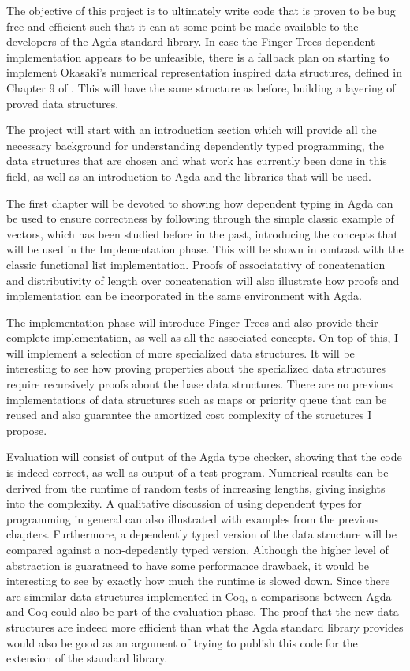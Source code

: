 \documentclass[12pt]{article}
\begin{document}
The objective of this project is to ultimately write code that is proven to be
bug free and efficient such that it can at some point be made available to the
developers of the Agda standard library.
In case the Finger Trees dependent implementation appears to be unfeasible,
there is a fallback plan on starting to implement Okasaki's numerical representation
inspired data structures, defined in Chapter 9 of \cite{okasaki}. This will have the same
structure as before, building a layering of proved data structures.

The project will start with an introduction section which will provide all the
necessary background for understanding dependently typed programming, the
data structures that are chosen and what work has currently been done in this
field, as well as an introduction to Agda and the libraries that will be used.

The first chapter will be devoted to showing how dependent typing in Agda can be
used to ensure correctness by following through the simple classic example of
vectors, which has been studied before in the past, introducing the concepts that
will be used in the Implementation phase. This will be shown in contrast with
the classic functional list implementation. Proofs of associatativy of concatenation
and distributivity of length over concatenation will also illustrate how
proofs and implementation can be incorporated in the same environment with Agda.

The implementation phase will introduce Finger Trees and also provide their complete
implementation, as well as all the associated concepts. On top of this,
I will implement a selection of more specialized data structures. It will
be interesting to see how proving properties about the specialized data structures
require recursively proofs about the base data structures. There are no previous
implementations of data structures such as maps or priority queue that can be reused
and also guarantee the amortized cost complexity of the structures I propose.

Evaluation will consist of output of the Agda type checker, showing that the
code is indeed correct, as well as output of a test program. Numerical results
can be derived from the runtime of random tests of increasing lengths, giving
insights into the complexity.
A qualitative discussion of using dependent types for programming in general
can also illustrated with examples from the previous chapters.
Furthermore, a dependently typed version of the data structure will be compared
against a non-depedently typed version. Although the higher level of abstraction
is guaratneed to have some performance drawback, it would be interesting to see
by exactly how much the runtime is slowed down.
Since there are simmilar data structures implemented in Coq, a comparisons between
Agda and Coq could also be part of the evaluation phase.
The proof that the new data structures are indeed more efficient than what the
Agda standard library provides would also be good as an argument of trying to
publish this code for the extension of the standard library.
\end{document}
